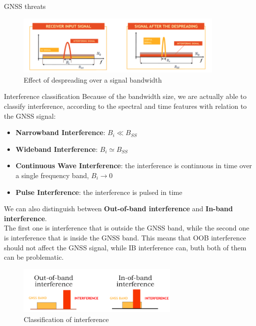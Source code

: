 \begin{section}{GNSS threats}
      \begin{figure}[h]
        \centering
        \includegraphics[width=0.9\textwidth]{img/wireless/signal despreading.png}
        \caption{Effect of despreading over a signal bandwidth}
        \label{fig:GNSS despreading}
      \end{figure}
      \begin{subsection}{Interference classification}
        Because of the bandwidth size, we are actually able to classify interference, according to 
        the spectral and time features with relation to the GNSS signal:
        \begin{itemize}
          \item \textbf{Narrowband Interference}: $B_i \ll B_{SS}$
          \item \textbf{Wideband Interference}: $B_i \simeq B_{SS}$
          \item \textbf{Continuous Wave Interference}: the interference is continuous in time
            over a single frequency band, $B_i \to 0$
          \item \textbf{Pulse Interference}: the interference is pulsed in time
        \end{itemize}

        We can also distinguish between \textbf{Out-of-band interference} and \textbf{In-band
        interference}.\\
        The first one is interference that is outside the GNSS band, while the second one is
        interference that is inside the GNSS band. This means that OOB interference should not 
        affect the GNSS signal, while IB interference can, buth both of them can be problematic.\\

        \begin{figure}[h]
          \centering
          \includegraphics[width=0.7\textwidth]{img/wireless/in and out of band interference.png}
          \caption{Classification of interference}
          \label{fig:GNSS interference classification}
        \end{figure}


\end{subsection}
\end{section}
